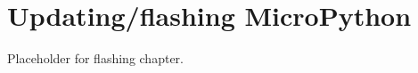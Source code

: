 \setchapterpreamble[u]{\margintoc}
\chapter{\color{gray} Updating/flashing MicroPython \color{black}}

Placeholder for flashing chapter.

%
